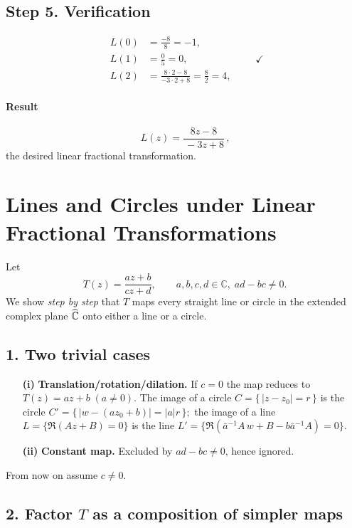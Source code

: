 \documentclass[12pt]{article}
\theoremstyle{definition} %
\theoremstyle{plain} %
\begin{document}
\subsection*{Step 5.  Verification}
\[
\begin{aligned}
   L(0)&=\frac{-8}{8}=-1,\\
   L(1)&=\frac{0}{5}=0,\\
   L(2)&=\frac{8\cdot2-8}{-3\cdot2+8}
        =\frac{8}{2}=4,
\end{aligned}
\qquad\checkmark
\]

\paragraph{Result}
\[
   \boxed{\,L(z)=\dfrac{8z-8}{\, -3z+8}\,},
\]
the desired linear fractional transformation.
\section*{Lines and Circles under Linear Fractional Transformations}

Let 
\[
   T(z)=\frac{az+b}{cz+d},\qquad a,b,c,d\in\mathbb C,\;ad-bc\ne0.
\]
We show \emph{step by step} that $T$ maps every straight line or circle in
the extended complex plane $\widehat{\Bbb C}$ onto either a line or a
circle.

\subsection*{1.  Two trivial cases}

\begin{enumerate}
\item[\textbf{(i)}] \textbf{Translation/rotation/dilation.}  
      If $c=0$ the map reduces to 
      \(
         T(z)=az+b\;(a\ne0).
      \)
      The image of a circle 
      \(
         C=\{\,|z-z_{0}|=r\,\}
      \)
      is the circle
      \(
         C'=\{\,|w-(az_{0}+b)|=|a|r\,\};
      \)
      the image of a line
      \(
         L=\{\Re(Az+B)=0\}
      \)
      is the line
      \(
         L'=\{\Re(\bar{a}^{-1}A\,w+B-b\bar{a}^{-1}A)=0\}.
      \)
\item[\textbf{(ii)}] \textbf{Constant map.}  
      Excluded by $ad-bc\ne0$, hence ignored.
\end{enumerate}
From now on assume $c\ne0$.

\subsection*{2.  Factor \(T\) as a composition of simpler maps}
\end{document}
